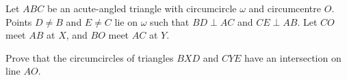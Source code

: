 Let $ABC$ be an acute-angled triangle with circumcircle $\omega$ and circumcentre $O$. Points $D \neq B$ and $E \neq C$ lie on $\omega$ such that $BD \perp AC$ and $CE \perp AB$. Let $CO$ meet $AB$ at $X$, and $BO$ meet $AC$ at $Y$.

Prove that the circumcircles of triangles $BXD$ and $CYE$ have an intersection on line $AO$.
